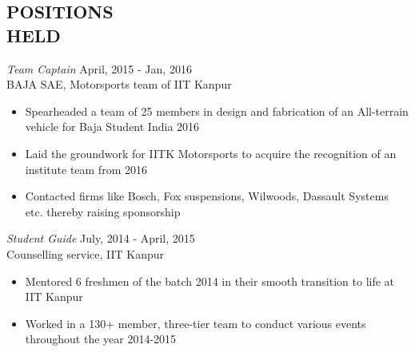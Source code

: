 \documentclass[margin, 10pt]{res} %
\begin{document}
\begin{resume}
 






\section{ POSITIONS \\HELD}

{\sl Team Captain} \hfill April, 2015 - Jan, 2016\\
BAJA SAE, Motorsports team of IIT Kanpur\\ 
\begin{itemize} \itemsep -2pt

\item Spearheaded a team of 25 members in design and fabrication of an All-terrain vehicle for Baja Student India 2016
\item Laid the groundwork for IITK Motorsports to acquire the recognition of an institute team from  2016
\item Contacted firms like Bosch, Fox suspensions, Wilwoods, Dassault Systems etc. thereby  raising sponsorship

\end{itemize}

{\sl 	Student Guide} \hfill July, 2014 - April, 2015\\
 Counselling service, IIT Kanpur\\
\begin{itemize} \itemsep -2pt
\item Mentored 6 freshmen of the batch 2014 in their smooth transition to life at IIT Kanpur
\item Worked in a 130+ member, three-tier team to conduct various events throughout the year 2014-2015 
\end{itemize}
\clearpage

\end{resume}
\end{document}

